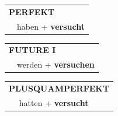 \documentclass[10pt,a4paper]{revtex4-2}
\begin{document}
\begin{verbbox-acc}
    \vspace{10pt}

 \begin{tabular}{rl}
     \multicolumn{2}{l}{\textbf{PERFEKT}}\\
  &  haben + \textbf{versucht}\\
  \end{tabular}
\hfill
   \begin{tabular}{rl}
   
    \multicolumn{2}{l}{\textbf{FUTURE I} }\\
  &  werden + \textbf{versuchen}\\
 
  \end{tabular}
\hfill
   \begin{tabular}{rl}
      \multicolumn{2}{l}{\textbf{PLUSQUAMPERFEKT}}\\
   & hatten + \textbf{versucht}\\
  \end{tabular}
  
  \vspace{-5pt}


\end{verbbox-acc}
\end{document}
